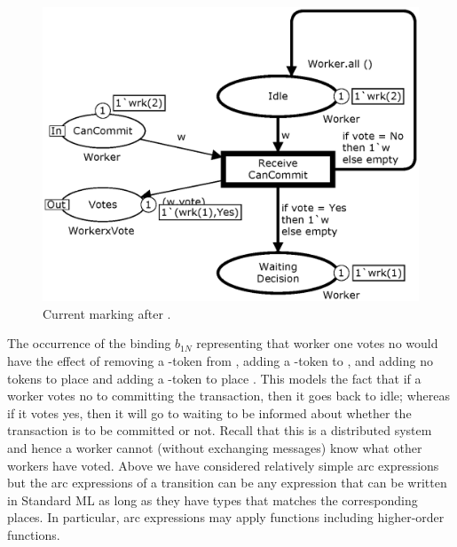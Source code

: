 \begin{figure}[h]
\centering
\includegraphics[scale=.5]{figures/ReceiveCanCommit.eps}
\caption{Current marking after .}
\label{fig:receivecancommit}
\end{figure}

The occurrence of the binding $b_{1N}$ representing that worker one
votes no would have the effect of removing a -token
from , adding a -token to
, and adding no tokens to place
 and adding a -token to place
. This models the fact that if a worker votes no to
committing the transaction, then it goes back to idle; whereas if it
votes yes, then it will go to waiting to be informed about whether the
transaction is to be committed or not.  Recall that this is a
distributed system and hence a worker cannot (without exchanging
messages) know what other workers have voted.  Above we have
considered relatively simple arc expressions but the arc expressions
of a transition can be any expression that can be written in Standard
ML as long as they have types that matches the corresponding
places. In particular, arc expressions may apply functions including
higher-order functions.

